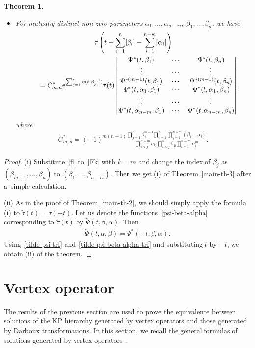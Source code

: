 \documentclass[10pt,a4paper]{amsart}
\numberwithin{equation}{section}
\newtheorem{Theorem}{Theorem}[section]
\theoremstyle{definition}
\begin{document}
\begin{Theorem}
\begin{itemize}
\item[$(ii)$] For mutually distinct non-zero parameters $\alpha_1,\dots ,\alpha_{n-m}$, $\beta_1,\dots ,\beta_n$, we have
\begin{gather*}
\tau\left(t+\sum_{i=1}^{n}[\beta_i]-\sum_{i=1}^{n-m}[\alpha_i]\right)\\
\qquad
=
C_{m,n}^\ast
{\rm e}^{\sum_{j=1}^n\eta(t,\beta_j^{-1})}
\tau(t)
\left|
\begin{matrix}
\Psi^\ast(t,\beta_1)&\cdots&\Psi^\ast(t,\beta_n)\\
\vdots&\cdots&\vdots\\
\Psi^{\ast(m-1)}(t,\beta_1)&\cdots&\Psi^{\ast(m-1)}(t,\beta_n)\\
\Psi^\ast(t,\alpha_1,\beta_1)&\cdots&\Psi^\ast(t,\alpha_1,\beta_n)\\
\vdots&\cdots&\vdots\\
\Psi^\ast(t,\alpha_{n-m},\beta_1)&\cdots&\Psi^\ast(t,\alpha_{n-m},\beta_n)\\
\end{matrix}
\right|,
\end{gather*}
where
\begin{gather*}
C^\ast_{m,n}=
(-1)^{m(n-1)}
\frac{\prod_{j=1}^n\beta_j^{m-1}\prod_{i=1}^{n}\prod_{j=1}^{n-m}(\beta_i-\alpha_j)}
{\prod_{i<j}^{n-m}\alpha_{ij}\prod_{i<j}^{n}\beta_{ji}\prod_{i=1}^{n-m}\alpha_i^m}.
\end{gather*}
\end{itemize}
\end{Theorem}


\begin{proof}
(i) Substitute~\eqref{fl} to~\eqref{Fk} with $k=m$ and change the index of $\beta_j$ as
$(\beta_{m+1},\dots ,\beta_n)$ to $(\beta_1,\dots ,\beta_{n-m})$. Then we get (i) of Theorem~\ref{main-th-3} after a~simple calculation.


(ii) As in the proof of Theorem~\ref{main-th-2}, we should simply apply the formula (i)
to $\tilde{\tau}(t)=\tau(-t)$. Let us denote the functions~\eqref{psi-beta-alpha}
corresponding to $\tilde{\tau}(t)$ by $\tilde{\Psi}(t,\beta,\alpha)$. Then
\begin{gather}
\tilde{\Psi}(t,\alpha,\beta)=\Psi^\ast(-t,\beta,\alpha).
\label{tilde-psi-beta-alpha-trf}
\end{gather}
Using~\eqref{tilde-psi-trf} and~\eqref{tilde-psi-beta-alpha-trf} and substituting $t$ by $-t$, we
obtain (ii) of the theorem.
\end{proof}

\section{Vertex operator}\label{sec3}
The results of the previous section are used to prove the equivalence
between solutions of the KP hierarchy generated by vertex operators and
those generated by Darboux transformations.
In this section, we recall the general formulas of solutions generated by vertex operators~\cite{Nak2024}.
\end{document}
